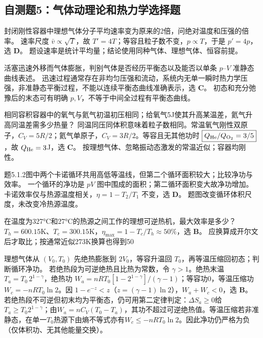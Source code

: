 
\subsection{自测题5：气体动理论和热力学选择题}

\problemtext 封闭刚性容器中理想气体分子平均速率变为原来的2倍，问绝对温度和压强的倍率。
\workings 速率尺度 $\bar v\propto\sqrt T$，故 $T'=4T$；等容且粒子数不变，$p\propto T$，于是 $p'=4p$，选 \textbf{D}。
\crosscheck 题设速率是统计平均量；结论使用同种气体、理想气体、恒容前提。

\problemtext 活塞迅速外移而气体膨胀，判别气体是否经历平衡态以及能否以单条 $p$--$V$ 准静态曲线表述。
\workings 迅速过程通常存在非均匀压强和流动，系统内无单一瞬时热力学压强，非准静态平衡过程，不能以连续平衡态曲线准确表示，选 \textbf{C}。
\crosscheck 初态和充分弛豫后的末态可有明确 $p,V$，不等于中间全过程有平衡态曲线。

\problemtext 相同容积容器中的氧气与氦气初温初压相同；给氧气5J使其升高某温差，氦气升高同温差需多少热量？
\workings 同温同压同体积意味着粒子数相同。常温氧气刚性双原子，$C_V=5R/2$；氦气单原子，$C_V=3R/2$。等容且无其他功时 $\boxed{Q_{\rm He}/Q_{\rm O_2}=3/5}$，故 $Q_{\rm He}=3$J，选 \textbf{C}。
\crosscheck 按理想气体、忽略振动态激发的常温近似；容器均刚性。

\problemtext 题5.1.2图中两个卡诺循环共用高低等温线，但第二个循环面积较大；比较净功与效率。
\workings 一个循环的净功是 $pV$ 图中围成的面积；第二循环面积变大故净功增加。卡诺效率仅与热源温度相关，$\eta=1-T_2/T_1$ 不变，选 \textbf{D}。
\crosscheck 题图改变循环体积尺度，未改变冷热源温度。

\problemtext 在温度为327°C和27°C的热源之间工作的理想可逆热机，最大效率是多少？
\workings $T_h=600.15$K、$T_c=300.15$K，$\eta_{\max}=1-T_c/T_h\approx\boxed{50\%}$，选 \textbf{B}。
\crosscheck 应换算成开尔文后才取比；按通常近似273K换算也得到50%

\problemtext 理想气体从 $(V_0,T_0)$ 先绝热膨胀到 $2V_0$，等容升温回 $T_0$，再等温压缩回初态；判断循环净功。
\workings 若绝热段为可逆绝热且比热为常数，令 $\gamma>1$。绝热末温 $T_a=T_0\,2^{1-\gamma}$，绝热功 $W_a=nRT_0[1-2^{1-\gamma}]/(\gamma-1)$；等容功0，等温压缩功 $W_c=-nRT_0\ln2$。因 $1-e^{-z}<z$（$z=(\gamma-1)\ln2$），$W_a+W_c<0$，选 \textbf{B}。
\crosscheck 若绝热段不可逆但初末均为平衡态，仍可用第二定律判定：$\Delta S_a\ge0$给$T_a\ge T_0 2^{1-\gamma}$；由$W_a=nC_V(T_0-T_a)$，其功不超过可逆绝热值。等温压缩若非准静态，在单一$T_0$热源下由熵不等式亦有$W_c\le-nRT_0\ln2$。因此净功仍严格为负（仅体积功、无其他能量交换）。

